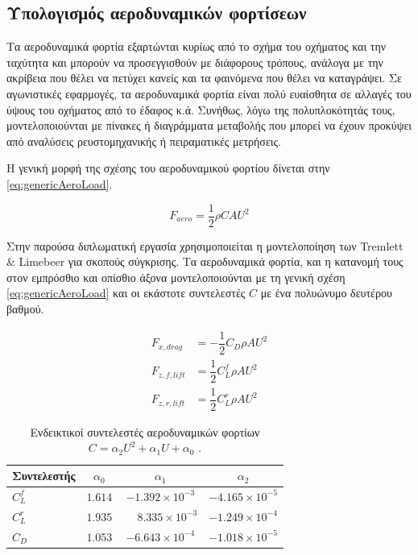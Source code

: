 \subsection{Υπολογισμός αεροδυναμικών φορτίσεων}

Τα αεροδυναμικά φορτία εξαρτώνται κυρίως από το σχήμα του οχήματος και την ταχύτητα και μπορούν να προσεγγισθούν
με διάφορους τρόπους, ανάλογα με την ακρίβεια που θέλει να πετύχει κανείς και τα φαινόμενα που θέλει να
καταγράψει. Σε αγωνιστικές εφαρμογές, τα αεροδυναμικά φορτία είναι πολύ ευαίσθητα σε αλλαγές του ύψους του
οχήματος από το έδαφος κ.ά. Συνήθως, λόγω της πολυπλοκότητάς τους, μοντελοποιούνται με πίνακες ή διαγράμματα
μεταβολής που μπορεί να έχουν προκύψει από αναλύσεις ρευστομηχανικής ή πειραματικές μετρήσεις.

Η γενική μορφή της σχέσης του αεροδυναμικού φορτίου δίνεται στην \cref{eq:genericAeroLoad}.

\begin{equation}
   F_{aero} = \dfrac{1}{2}\rho CAU^2
   \label{eq:genericAeroLoad} 
\end{equation}

\noindent
Στην παρούσα διπλωματική εργασία χρησιμοποιείται η μοντελοποίηση των Tremlett \& Limebeer \cite{Tremlett2016} για σκοπούς σύγκρισης. Τα αεροδυναμικά φορτία,
και η κατανομή τους στον εμπρόσθιο και οπίσθιο άξονα μοντελοποιούνται με τη γενική
σχέση \ref{eq:genericAeroLoad} και οι εκάστοτε συντελεστές $C$ με ένα πολυώνυμο
δευτέρου βαθμού.

\begin{align}
F_{x,drag} &= -\dfrac{1}{2}C_D\rho AU^2 \label{eq:drag}\\
F_{z,f,lift} &= \dfrac{1}{2}C_L^f\rho AU^2 \label{eq:liftFront}\\
F_{z,r,lift} &= \dfrac{1}{2}C_L^r\rho AU^2
\label{eq:liftRear}
\end{align}

\begin{table}[htbp]
    \centering
    \begin{tabular}{lccc}
        \toprule
        Συντελεστής & $\alpha_0$ & $\alpha_1$ & $\alpha_2$ \\
        \midrule
        $C_L^f$ & $1.614$ & $-1.392 \times 10^{-3}$ & $-4.165 \times 10^{-5}$ \\
        $C_L^r$ & $1.935$ & $\phantom{-}8.335 \times 10^{-3}$ & $-1.249 \times 10^{-4}$ \\
        $C_D$   & $1.053$ & $-6.643 \times 10^{-4}$ & $-1.018 \times 10^{-5}$ \\
        \bottomrule
    \end{tabular}
    \caption{Ενδεικτικοί συντελεστές αεροδυναμικών φορτίων $C = \alpha_2U^2+\alpha_1U+\alpha_0$ \cite{Tremlett2016}.}
    \label{tab:aero_coeffs}
\end{table}